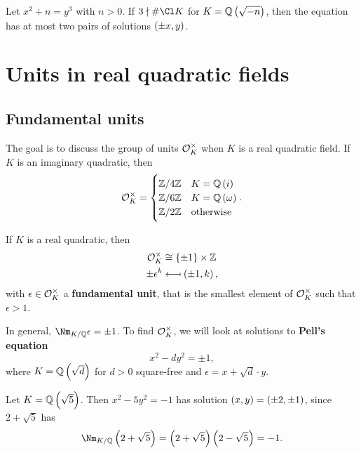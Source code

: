 \begin{remark*}
Let $ x^2 + n = y^3 $ with $ n > 0 $. If $ 3 \nmid \#\Cl K $ for $ K = \QQ\br{\sqrt{-n}} $, then the equation has at most two pairs of solutions $ \br{\pm x, y} $.
\end{remark*}

\pagebreak

\section{Units in real quadratic fields}

\subsection{Fundamental units}


The goal is to discuss the group of units $ \mathcal{O}_K^\times $ when $ K $ is a real quadratic field. If $ K $ is an imaginary quadratic, then
$$ \OOO_K^\times =
\begin{cases}
\ZZ / 4\ZZ & K = \QQ\br{i} \\
\ZZ / 6\ZZ & K = \QQ\br{\omega} \\
\ZZ / 2\ZZ & \text{otherwise}
\end{cases}.
$$

\begin{theorem}
If $ K $ is a real quadratic, then
\begin{align*}
\OOO_K^\times & \cong \cbr{\pm 1} \times \ZZ \\
\pm\epsilon^k & \longmapsfrom \br{\pm 1, k},
\end{align*}
with $ \epsilon \in \mathcal{O}_K^\times $ a \textbf{fundamental unit}, that is the smallest element of $ \mathcal{O}_K^\times $ such that $ \epsilon > 1 $.
\end{theorem}

In general, $ \Nm_{K / \QQ} \epsilon = \pm 1 $. To find $ \mathcal{O}_K^\times $, we will look at solutions to \textbf{Pell's equation}
$$ x^2 - dy^2 = \pm 1, $$
where $ K = \QQ\br{\sqrt{d}} $ for $ d > 0 $ square-free and $ \epsilon = x + \sqrt{d} \cdot y $.

\begin{example*}
Let $ K = \QQ\br{\sqrt{5}} $. Then $ x^2 - 5y^2 = -1 $ has solution $ \br{x, y} = \br{\pm 2, \pm 1} $, since $ 2 + \sqrt{5} $ has
$$ \Nm_{K / \QQ} \br{2 + \sqrt{5}} = \br{2 + \sqrt{5}}\br{2 - \sqrt{5}} = -1. $$
\end{example*}


